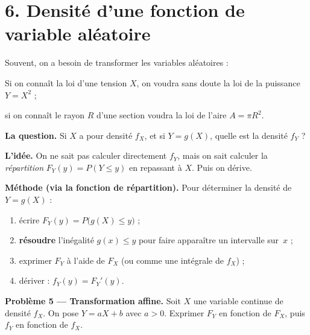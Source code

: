 \section*{6. Densité d'une fonction de variable aléatoire}

Souvent, on a besoin de transformer les variables aléatoires : 

Si on connaît la loi d'une tension $X$, on voudra sans doute
la loi de la puissance $Y=X^2$ ; 

si on connaît le rayon $R$
d'une section voudra la loi de l'aire $A=\pi R^2$.

\medskip

\textbf{La question.}
Si $X$ a pour densité $f_X$, et si $Y=g(X)$, quelle est la densité $f_Y$ ?

\medskip

\textbf{L'idée.}
On ne sait pas calculer directement $f_Y$, mais on sait calculer
la \emph{répartition} $F_Y(y)=P(Y\le y)$ en repassant à $X$.
Puis on dérive.

\begin{mdframed}[backgroundcolor=ThemeLight, linecolor=Theme,
  linewidth=1pt, innertopmargin=8pt, innerbottommargin=8pt, nobreak=true]
\textbf{Méthode (via la fonction de répartition).}
Pour déterminer la densité de $Y=g(X)$ :
\begin{enumerate}
  \item écrire $F_Y(y)=P\bigl(g(X)\le y\bigr)$ ;
  \item \textbf{résoudre} l'inégalité $g(x)\le y$ pour faire apparaître
    un intervalle sur~$x$ ;
  \item exprimer $F_Y$ à l'aide de $F_X$ (ou comme une intégrale de $f_X$) ;
  \item dériver : $f_Y(y)=F_Y'(y)$.
\end{enumerate}
\end{mdframed}

\textbf{Problème 5 --- Transformation affine.}
Soit $X$ une variable continue de densité $f_X$.
On pose $Y=aX+b$ avec $a>0$.
Exprimer $F_Y$ en fonction de $F_X$, puis $f_Y$ en fonction de $f_X$.


